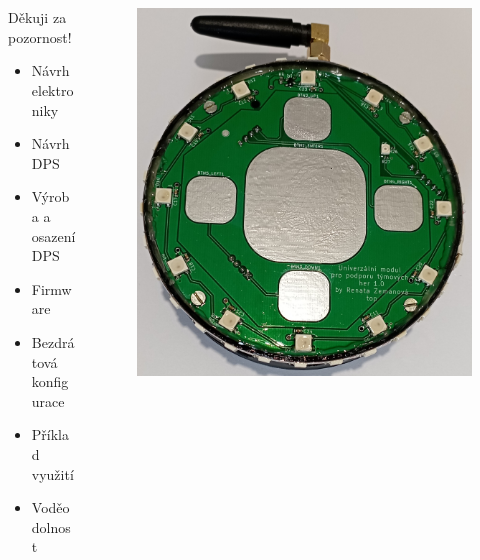 \documentclass[%
  12pt,       				%
	t,                  %
	aspectratio=1610,   %
	unicode,						%
]{beamer}				    	%
\begin{document}
\begin{frame}[c] 
	\frametitle{\mbox{ }}
	\begin{center}
		\begin{columns}[T] 								%
			\begin{column}{0.3\textwidth}		%
				{\Huge Děkuji za pozornost!}
				\vspace{0.5cm}
				\begin{itemize}
					\item Návrh elektroniky
					\item Návrh DPS
					\item Výroba a osazení DPS
					\item Firmware 
					\item Bezdrátová konfigurace
					\item Příklad využití 
					\item Voděodolnost
				\end{itemize}
			\end{column}
			\begin{column}{0.7\textwidth}		%
				\begin{figure}
					\centering
					\includegraphics[width=0.65\columnwidth]{obrazky/v_krabicce.jpg}
				\end{figure}
			\end{column}
		\end{columns}	
	\end{center}
\end{frame}
\end{document}

